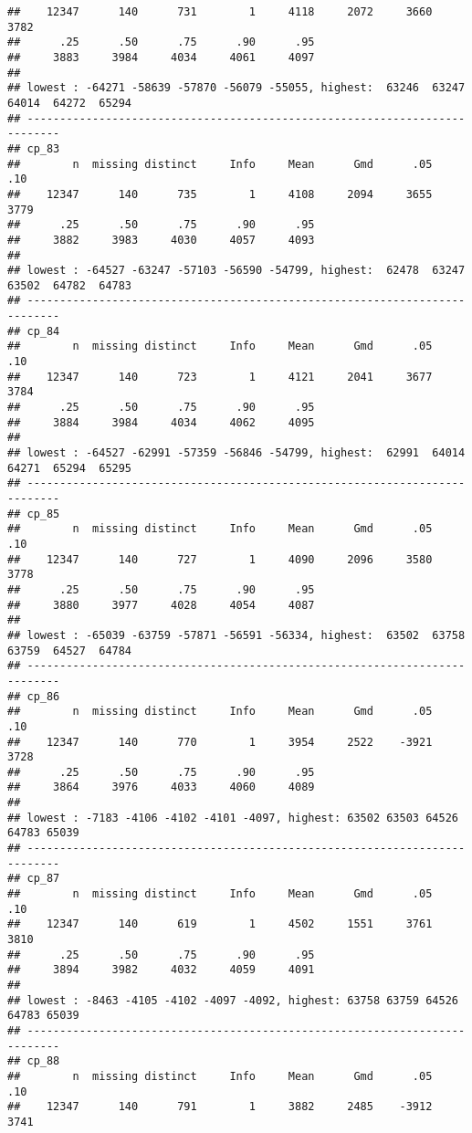 \documentclass[]{article}
\begin{document}
\begin{verbatim}
##    12347      140      731        1     4118     2072     3660     3782 
##      .25      .50      .75      .90      .95 
##     3883     3984     4034     4061     4097 
## 
## lowest : -64271 -58639 -57870 -56079 -55055, highest:  63246  63247  64014  64272  65294
## ---------------------------------------------------------------------------
## cp_83 
##        n  missing distinct     Info     Mean      Gmd      .05      .10 
##    12347      140      735        1     4108     2094     3655     3779 
##      .25      .50      .75      .90      .95 
##     3882     3983     4030     4057     4093 
## 
## lowest : -64527 -63247 -57103 -56590 -54799, highest:  62478  63247  63502  64782  64783
## ---------------------------------------------------------------------------
## cp_84 
##        n  missing distinct     Info     Mean      Gmd      .05      .10 
##    12347      140      723        1     4121     2041     3677     3784 
##      .25      .50      .75      .90      .95 
##     3884     3984     4034     4062     4095 
## 
## lowest : -64527 -62991 -57359 -56846 -54799, highest:  62991  64014  64271  65294  65295
## ---------------------------------------------------------------------------
## cp_85 
##        n  missing distinct     Info     Mean      Gmd      .05      .10 
##    12347      140      727        1     4090     2096     3580     3778 
##      .25      .50      .75      .90      .95 
##     3880     3977     4028     4054     4087 
## 
## lowest : -65039 -63759 -57871 -56591 -56334, highest:  63502  63758  63759  64527  64784
## ---------------------------------------------------------------------------
## cp_86 
##        n  missing distinct     Info     Mean      Gmd      .05      .10 
##    12347      140      770        1     3954     2522    -3921     3728 
##      .25      .50      .75      .90      .95 
##     3864     3976     4033     4060     4089 
## 
## lowest : -7183 -4106 -4102 -4101 -4097, highest: 63502 63503 64526 64783 65039
## ---------------------------------------------------------------------------
## cp_87 
##        n  missing distinct     Info     Mean      Gmd      .05      .10 
##    12347      140      619        1     4502     1551     3761     3810 
##      .25      .50      .75      .90      .95 
##     3894     3982     4032     4059     4091 
## 
## lowest : -8463 -4105 -4102 -4097 -4092, highest: 63758 63759 64526 64783 65039
## ---------------------------------------------------------------------------
## cp_88 
##        n  missing distinct     Info     Mean      Gmd      .05      .10 
##    12347      140      791        1     3882     2485    -3912     3741 

\end{verbatim}
\end{document}
